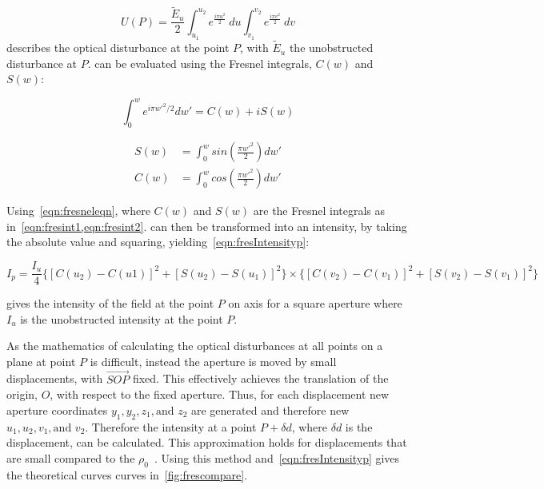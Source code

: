 \begin{equation}
U(P)=\frac{\tilde{E}_u}{2}\int_{u_1}^{u_2} e^{\tfrac{i\pi u^2}{2}}\ du\int_{v_1}^{v_2} e^{\tfrac{i\pi v^2}{2}} \ dv
\label{eqn:pentdisturb}
\end{equation}
 describes the optical disturbance at the point $P$, with $\tilde{E}_u$ the unobstructed disturbance at $P$.
 can be evaluated using the Fresnel integrals, $C(w)$ and $S(w)$:


\begin{equation}
\int_{0}^{w}e^{i\pi w'^2/2}dw'=C(w)+iS(w)
\label{eqn:fresneleqn}
\end{equation}


\begin{align}
S(w)&=\int^w_0 sin\left(\frac{\pi w'^2}{2}\right)dw'\label{eqn:fresint1}\\
C(w)&=\int^w_0 cos\left(\frac{\pi w'^2}{2}\right)dw'\label{eqn:fresint2}
\end{align}


Using~\cref{eqn:fresneleqn}, where $C(w)$ and $S(w)$ are the Fresnel integrals as in~\cref{eqn:fresint1,eqn:fresint2}.
 can then be transformed into an intensity, by taking the absolute value and squaring, yielding~\cref{eqn:fresIntensityp}:


\begin{equation}
I_p = \frac{I_u}{4} \{[C(u_2) - C(u1)]^2 + [S(u_2) - S(u_1)]^2\} \times \{[C(v_2) - C(v_1)]^2 + [S(v_2) - S(v_1)]^2\}
\label{eqn:fresIntensityp}
\end{equation}

 gives the intensity of the field at the point $P$ on axis for a square aperture where $I_u$ is the unobstructed intensity at the point $P$. 

\medskip

As the mathematics of calculating the optical disturbances at all points on a plane at point $P$ is difficult, instead the aperture is moved by small displacements, with $\overrightarrow{SOP}$ fixed.
This effectively achieves the translation of the origin, $O$, with respect to the fixed aperture. 
Thus, for each displacement new aperture coordinates $y_1, y_2, z_1, \text{and } z_2$ are generated and therefore new $u_1, u_2, v_1, \text{and }v_2$.
Therefore the intensity at a point $P +\delta d$, where $\delta d$ is the displacement, can be calculated.
This approximation holds for displacements that are small compared to the $\rho_0$~\cite{born2000principles,hecht2017optics,goodman2017introduction}.
Using this method and~\cref{eqn:fresIntensityp} gives the theoretical curves curves in~\cref{fig:frescompare}.

